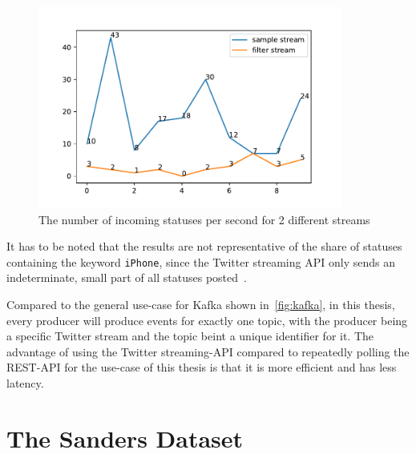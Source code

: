 \begin{figure}
    \centering
    \caption{The number of incoming statuses per second for 2 different streams}
    \label{fig:stream_frequency}
    \includegraphics[width=10cm]{../figures/stream_frequencies.pdf}
\end{figure}

It has to be noted that the results are not representative of the share of statuses containing the keyword \texttt{iPhone},
since the Twitter streaming API only sends an indeterminate, small part of all statuses posted~\cite{twitterDocs}.

Compared to the general use-case for Kafka shown in~\cref{fig:kafka}, in this thesis,
every producer will produce events for exactly one topic, with the producer being a specific Twitter stream and the topic beint a unique identifier for it.
The advantage of using the Twitter streaming-API compared to repeatedly polling the REST-API for the use-case of this thesis
is that it is more efficient and has less latency.

\section{The Sanders Dataset}
\label{sec:theSandersDataset}

